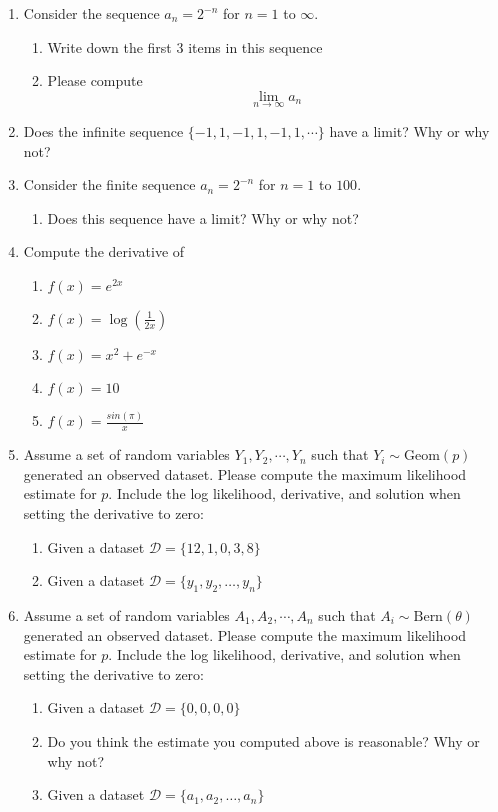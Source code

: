 \begin{enumerate}
    \item Consider the sequence $a_{n} = 2^{-n}$ for $n=1$ to $\infty$. 
    \begin{enumerate}
        \item Write down the first 3 items in this sequence 
        \item Please compute \[ \lim_{n \to \infty} a_{n} \]
    \end{enumerate}
    
    \item Does the infinite sequence $\{-1,1,-1,1,-1,1, \cdots \}$ have a limit? Why or why not? 
    
    \item Consider the finite sequence $a_{n} = 2^{-n}$ for $n=1$ to $100$. 
    \begin{enumerate}
        \item Does this sequence have a limit? Why or why not?
    \end{enumerate}
    
    \item Compute the derivative of 
    \begin{enumerate}
        \item $f(x) = e^{2x}$
        \item $f(x) = \log(\frac{1}{2x})$
        \item $f(x) = x^{2} + e^{-x}$
        \item $f(x) = 10$
        \item $f(x) = \frac{sin(\pi)}{x}$
    \end{enumerate}
    
    \item  Assume a set of random variables $Y_{1}, Y_{2}, \cdots, Y_{n}$ such that $Y_{i} \sim \text{Geom}(p)$ generated an observed dataset. Please compute the maximum likelihood estimate for $p$. Include the log likelihood, derivative, and solution when setting the derivative to zero: 
    \begin{enumerate}
        \item Given a dataset $\mathcal{D} = \{ 12, 1, 0, 3, 8  \}$
        \item Given a dataset $\mathcal{D} = \{y_{1}, y_{2}, \dots, y_{n}\}$
    \end{enumerate}
    
    \item Assume a set of random variables $A_{1}, A_{2}, \cdots, A_{n}$ such that $A_{i} \sim \text{Bern}(\theta)$ generated an observed dataset. Please compute the maximum likelihood estimate for $p$. Include the log likelihood, derivative, and solution when setting the derivative to zero: 
    \begin{enumerate}
        \item Given a dataset $\mathcal{D} = \{ 0,0,0,0 \}$
        \item Do you think the estimate you computed above is reasonable? Why or why not?
        \item Given a dataset $\mathcal{D} = \{a_{1}, a_{2}, \dots, a_{n}\}$
    \end{enumerate}
    

\end{enumerate}
